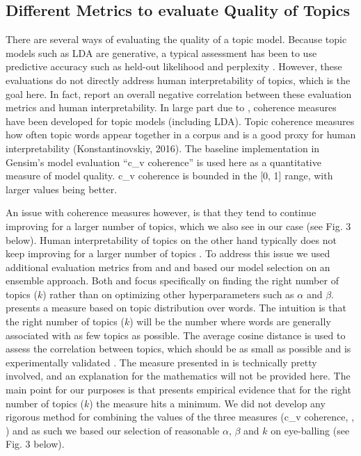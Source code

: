 \documentclass{article}
\begin{document}
    \subsection{Different Metrics to evaluate Quality of Topics}
There are several ways of evaluating the quality of a topic model. Because topic models such as LDA are generative, a typical assessment has been to use predictive accuracy such as held-out likelihood and perplexity \cite{chang2009reading}. However, these evaluations do not directly address human interpretability of topics, which is the goal here. In fact,  report an overall negative correlation between these evaluation metrics and human interpretability. In large part due to , coherence measures have been developed for topic models (including LDA). Topic coherence measures how often topic words appear together in a corpus and is a good proxy for human interpretability (Konstantinovskiy, 2016). The baseline implementation in Gensim’s model evaluation “c\_v coherence” is used here as a quantitative measure of model quality. c\_v coherence is bounded in the [0, 1] range, with larger values being better. 

An issue with coherence measures however, is that they tend to continue improving for a larger number of topics, which we also see in our case (see Fig. 3 below). Human interpretability of topics on the other hand typically does not keep improving for a larger number of topics \cite{chang2009reading}. To address this issue we used additional evaluation metrics from  and  and based our model selection on an ensemble approach. Both  and  focus specifically on finding the right number of topics ($k$) rather than on optimizing other hyperparameters such as $\alpha$ and $\beta$.  presents a measure based on topic distribution over words. The intuition is that the right number of topics ($k$) will be the number where words are generally associated with as few topics as possible. The average cosine distance is used to assess the correlation between topics, which should be as small as possible and is experimentally validated \cite{cao2009density}. The measure presented in  is technically pretty involved, and an explanation for the mathematics will not be provided here. The main point for our purposes is that  presents empirical evidence that for the right number of topics ($k$) the measure hits a minimum. We did not develop any rigorous method for combining the values of the three measures (c\_v coherence, \cite{cao2009density}, \cite{arun2010finding}) and as such we based our selection of reasonable $\alpha$, $\beta$ and $k$ on eye-balling (see Fig. 3 below). 
\end{document}
